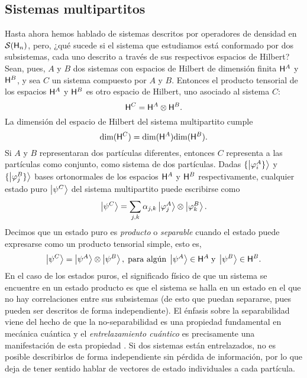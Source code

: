 \subsection{Sistemas multipartitos}\label{sec:Ch1PartialTrace}


Hasta ahora hemos hablado de sistemas descritos por operadores de densidad en $\mathcal{S}({\sf H}_{n})$, pero, ¿qué sucede si el sistema que estudiamos está conformado por dos subsistemas, cada uno descrito a través de sus respectivos espacios de Hilbert? Sean, pues, $A$ y $B$ dos sistemas con espacios de Hilbert de dimensión finita ${\sf H}^{A}$ y ${\sf H}^{B}$, y sea $C$ un sistema compuesto por $A$ y $B$. Entonces el producto tensorial de los espacios ${\sf H}^{A}$ y ${\sf H}^{B}$ es otro espacio de Hilbert, uno asociado al sistema $C$:
 \begin{equation}
     {\sf H}^{C}={\sf H}^{A}\otimes{\sf H}^{B}.\nonumber
 \end{equation}
 La dimensión del espacio de Hilbert del sistema multipartito cumple
\begin{equation}
    \text{dim}({\sf H}^{C})=\text{dim}({\sf H}^{A})\text{dim}({\sf H}^{B}).\nonumber
\end{equation}
Si $A$ y $B$ representaran dos partículas diferentes, entonces $C$ representa a las partículas como conjunto, como sistema de dos partículas. Dadas $\{\ket{\varphi_{i}^{A}\}}$ y $\{\ket{\varphi_{j}^{B}\}}$ bases ortonormales de los espacios ${\sf H}^{A}$ y ${\sf H}^{B}$ respectivamente, cualquier estado puro $\ket{\psi^{C}}$ del sistema multipartito puede escribirse como
\begin{equation}
    \ket{\psi^{C}}=\sum_{j,k}\alpha_{j,k}\ket{\varphi_{j}^{A}}\otimes\ket{\varphi_{k}^{B}}.\nonumber
\end{equation}
Decimos que un estado puro es \textit{producto} o \textit{separable} cuando el estado puede expresarse como un producto tensorial simple, esto es,
\begin{equation}
    \ket{\psi^{C}}=\ket{\psi^{A}}\otimes\ket{\psi^{B}},\; \text{para algún}\; \ket{\psi^{A}}\in{\sf H}^{A} \; \text{y} \; \ket{\psi^{B}}\in{\sf H}^{B}.\nonumber
\end{equation} 
En el caso de los estados puros, el significado físico de que un sistema se encuentre en un estado producto es que el sistema se halla en un estado en el que no hay correlaciones entre sus subsistemas (de esto que puedan separarse, pues pueden ser descritos de forma independiente). El énfasis sobre la separabilidad viene del hecho de que la no-separabilidad es una propiedad fundamental en mecánica cuántica y el \textit{entrelazamiento cuántico} es precisamente una manifestación de esta propiedad \cite{Holevo}. Si dos sistemas están entrelazados, no es posible describirlos de forma independiente sin pérdida de información, por lo que deja de tener sentido hablar de vectores de estado individuales a cada partícula. 

